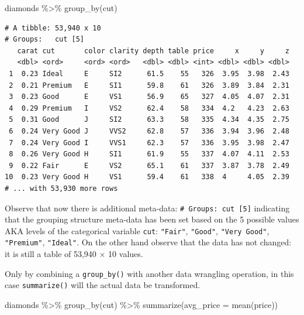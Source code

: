 \documentclass[
  letterpaper,
  DIV=11,
  numbers=noendperiod]{scrreprt}
\newenvironment{Shaded}{\begin{snugshade}}{\end{snugshade}}
\newcommand{\AttributeTok}[1]{\textcolor[rgb]{0.40,0.45,0.13}{#1}}
\newcommand{\FunctionTok}[1]{\textcolor[rgb]{0.28,0.35,0.67}{#1}}
\newcommand{\NormalTok}[1]{\textcolor[rgb]{0.00,0.23,0.31}{#1}}
\newcommand{\SpecialCharTok}[1]{\textcolor[rgb]{0.37,0.37,0.37}{#1}}
\theoremstyle{definition}
\theoremstyle{remark}
\begin{document}
\begin{Shaded}
\begin{Highlighting}[]
\NormalTok{diamonds }\SpecialCharTok{\%\textgreater{}\%} 
  \FunctionTok{group\_by}\NormalTok{(cut)}
\end{Highlighting}
\end{Shaded}

\begin{verbatim}
# A tibble: 53,940 x 10
# Groups:   cut [5]
   carat cut       color clarity depth table price     x     y     z
   <dbl> <ord>     <ord> <ord>   <dbl> <dbl> <int> <dbl> <dbl> <dbl>
 1  0.23 Ideal     E     SI2      61.5    55   326  3.95  3.98  2.43
 2  0.21 Premium   E     SI1      59.8    61   326  3.89  3.84  2.31
 3  0.23 Good      E     VS1      56.9    65   327  4.05  4.07  2.31
 4  0.29 Premium   I     VS2      62.4    58   334  4.2   4.23  2.63
 5  0.31 Good      J     SI2      63.3    58   335  4.34  4.35  2.75
 6  0.24 Very Good J     VVS2     62.8    57   336  3.94  3.96  2.48
 7  0.24 Very Good I     VVS1     62.3    57   336  3.95  3.98  2.47
 8  0.26 Very Good H     SI1      61.9    55   337  4.07  4.11  2.53
 9  0.22 Fair      E     VS2      65.1    61   337  3.87  3.78  2.49
10  0.23 Very Good H     VS1      59.4    61   338  4     4.05  2.39
# ... with 53,930 more rows
\end{verbatim}

Observe that now there is additional meta-data:
\texttt{\#\ Groups:\ cut\ {[}5{]}} indicating that the grouping
structure meta-data has been set based on the 5 possible values AKA
levels of the categorical variable \texttt{cut}: \texttt{"Fair"},
\texttt{"Good"}, \texttt{"Very\ Good"}, \texttt{"Premium"},
\texttt{"Ideal"}. On the other hand observe that the data has not
changed: it is still a table of 53,940 \(\times\) 10 values.

Only by combining a \texttt{group\_by()} with another data wrangling
operation, in this case \texttt{summarize()} will the actual data be
transformed.

\begin{Shaded}
\begin{Highlighting}[]
\NormalTok{diamonds }\SpecialCharTok{\%\textgreater{}\%} 
  \FunctionTok{group\_by}\NormalTok{(cut) }\SpecialCharTok{\%\textgreater{}\%} 
  \FunctionTok{summarize}\NormalTok{(}\AttributeTok{avg\_price =} \FunctionTok{mean}\NormalTok{(price))}
\end{Highlighting}
\end{Shaded}
\end{document}
